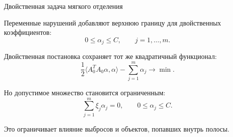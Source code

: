 \SPBGContentSlide
  {Двойственная задача мягкого отделения}
  {%
    \FormulaBody
    Переменные нарушений добавляют верхнюю границу для двойственных
    коэффициентов:
    \[
      0\leq \alpha_j\leq C,\qquad j=1,\ldots,m.
    \]

    Двойственная постановка сохраняет тот же квадратичный функционал:
    \[
      \frac12\langle A_0^TA_0\alpha,\alpha\rangle-
      \sum_{j=1}^{m}\alpha_j
      \to\min.
    \]

    Но допустимое множество становится ограниченным:
    \[
      \sum_{j=1}^{m}\xi_j\alpha_j=0,
      \qquad
      0\leq\alpha_j\leq C.
    \]

    \Body
    Это ограничивает влияние выбросов и объектов, попавших внутрь полосы.
  }

